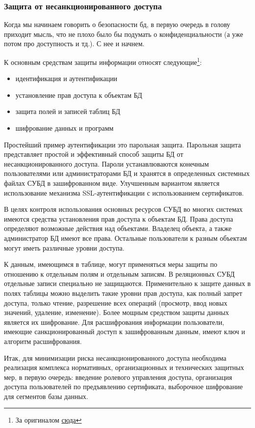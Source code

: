 \subsubsection{Защита от несанкционированного доступа}
Когда мы начинаем говорить о безопасности бд, в первую очередь в голову приходит мысль, что не плохо было бы подумать о конфиденциальности (а уже потом про доступность и тд.). С нее и начнем.

К основным средствам защиты информации относят следующие\footnote{За оригиналом \href{https://refdb.ru/look/2755914.html}{сюда}}:
\begin{itemize}
	\item идентификация и аутентификации
	\item установление прав доступа к объектам БД
	\item защита полей и записей таблиц БД
	\item шифрование данных и программ
\end{itemize}

Простейший пример аутентификации это парольная защита. Парольная защита представляет простой и эффективный способ защиты БД от несанкционированного доступа. Пароли устанавлюваются конечным пользователями или администраторами БД и хранятся в определенных системных файлах СУБД в зашифрованном виде. Улучшенным вариантом является использование механизма SSL-аутентификации с использованием сертификатов.

В целях контроля использования основных ресурсов СУБД во многих системах имеются средства установления прав доступа к объектам БД. Права доступа определяют возможные действия над объектами. Владелец объекта, а также администратор БД имеют все права. Остальные пользователи к разным объектам могут иметь различные уровни доступа.

К данным, имеющимся в таблице, могут применяться меры защиты по отношению к отдельным полям и отдельным записям. В реляционных СУБД отдельные записи специально не защищаются. Применительно к защите данных в полях таблицы можно выделить такие уровни прав доступа, как полный запрет доступа, только чтение, разрешение всех операций (просмотр, ввод новых значений, удаление, изменение). Более мощным средством защиты данных является их шифрование. Для расшифрования информации пользователи, имеющие санкционированный доступ к зашифрованным данным, имеют ключ и алгоритм расшифрования.

Итак, для минимизации риска несанкционированного доступа необходима реализация комплекса нормативных, организационных и технических защитных мер, в первую очередь: введение ролевого управления доступа, организация доступа пользователей по предъявлению сертификата, выборочное шифрование для сегментов базы данных.

